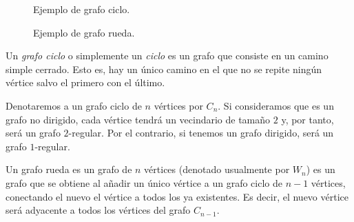 \begin{figure}[H]
  \centering
\begin{minipage}[t]{0.45\linewidth}
\centering
{}
\caption{Ejemplo de grafo ciclo.}
	\label{fig:grafo6}
\end{minipage}
\hspace{0.5cm}
\begin{minipage}[t]{0.45\linewidth}
\centering
\caption{Ejemplo de grafo rueda.}
\label{fig:grafo7}
\end{minipage}
\end{figure}

\begin{definition}
Un \emph{grafo ciclo} o simplemente un \emph{ciclo} es un grafo que consiste en un camino simple cerrado. Esto es, hay un único camino en el que no se repite ningún vértice salvo el primero con el último.

Denotaremos a un grafo ciclo de $n$ vértices por $C_n$. Si consideramos que es un grafo no dirigido, cada vértice tendrá un vecindario de tamaño $2$ y, por tanto, será un grafo $2$-regular. Por el contrario, si tenemos un grafo dirigido, será un grafo $1$-regular.
\end{definition}

\begin{definition}
Un grafo rueda es un grafo de $n$ vértices (denotado usualmente por $W_n$) es un grafo que se obtiene al añadir un único vértice a un grafo ciclo de $n-1$ vértices, conectando el nuevo el vértice a todos los ya existentes. Es decir, el nuevo vértice será adyacente a todos los vértices del grafo $C_{n-1}$.
\end{definition}

